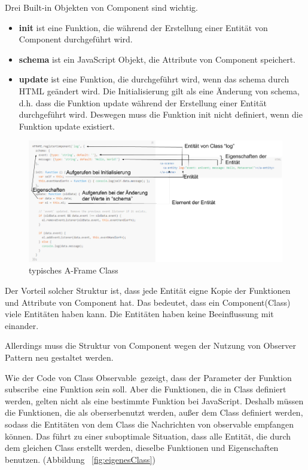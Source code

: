  Drei Built-in Objekten von Component sind wichtig.
 \begin{itemize}
     \item \textbf{init} ist eine Funktion, die während der Erstellung einer Entität von Component durchgeführt wird.
     \item \textbf{schema} ist ein JavaScript Objekt, die Attribute von Component speichert.
     \item \textbf{update} ist eine Funktion, die durchgeführt wird, wenn das schema durch HTML geändert wird. Die Initialisierung gilt als eine Änderung von schema, d.h. dass die Funktion update während der Erstellung einer Entität durchgeführt wird. Deswegen muss die Funktion init nicht definiert, wenn die Funktion update existiert.
 \end{itemize}
 
\begin{figure}[ht]
\vspace*{0.3cm}
\centering
\includegraphics[width=\textwidth]{images/aframeClass.png}
\caption[Typisches A-Frame Class]{typisches A-Frame Class}
\label{fig:aframeClass} 
\end{figure}
 
 Der Vorteil solcher Struktur ist, dass jede Entität eigne Kopie der Funktionen und Attribute von Component hat. Das bedeutet, dass ein Component(Class) viele Entitäten haben kann. Die Entitäten haben keine Beeinflussung mit einander.
 
 Allerdings muss die Struktur von Component wegen der Nutzung von Observer Pattern neu gestaltet werden.
 
 Wie der Code von Class \glqq Observable\grqq\ gezeigt, dass der Parameter der Funktion \glqq subscribe\grqq\ eine Funktion sein soll. Aber die Funktionen, die in Class definiert werden, gelten nicht als eine bestimmte Funktion bei JavaScript. Deshalb müssen die Funktionen, die als \glqq oberser\grqq benutzt werden, außer dem Class definiert werden, sodass die Entitäten von dem Class die Nachrichten von observable empfangen können. Das führt zu einer suboptimale Situation, dass alle Entität, die durch dem gleichen Class erstellt werden, dieselbe Funktionen und Eigenschaften benutzen. (Abbildung ~\ref{fig:eigenesClass})
 

